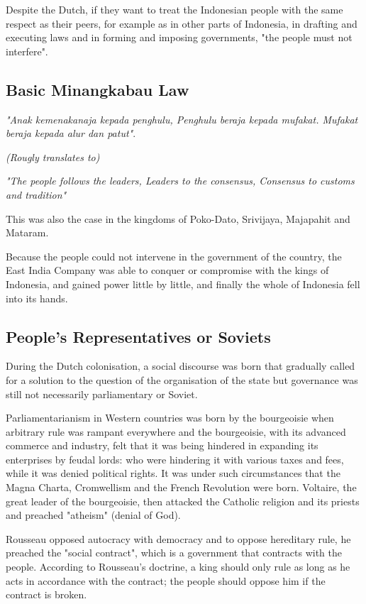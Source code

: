 Despite the Dutch, if they want to treat the Indonesian people with the same respect as their peers, 
for example as in other parts of Indonesia, in drafting and executing laws and in forming and imposing governments, 
"the people must not interfere".\nline

\subsection{Basic Minangkabau Law}

\emph{"Anak kemenakanaja kepada penghulu,\vskip 1mm Penghulu beraja kepada mufakat.\vskip 1mm Mufakat beraja kepada alur dan patut"}.\nline

\emph{(Rougly translates to)}\nline

\emph{"The people follows the leaders,\vskip 1mm Leaders to the consensus,\vskip 1mm Consensus to customs and tradition"}\nline

This was also the case in the kingdoms of Poko-Dato, Srivijaya, Majapahit and Mataram.\nline

Because the people could not intervene in the government of the country, the East India Company was able to 
conquer or compromise with the kings of Indonesia, and gained power little by little, and finally the whole 
of Indonesia fell into its hands.\nline

\subsection{People's Representatives or Soviets}

During the Dutch colonisation, a social discourse was born that gradually 
called for a solution to the question of the organisation of the state but governance was still 
not necessarily parliamentary or Soviet.\nline

Parliamentarianism in Western countries was born by the bourgeoisie when arbitrary rule was 
rampant everywhere and the bourgeoisie, with its advanced commerce and industry, felt that it 
was being hindered in expanding its enterprises by feudal lords: who were hindering it with various 
taxes and fees, while it was denied political rights. It was under such circumstances that 
the Magna Charta, Cromwellism and the French Revolution were born. Voltaire, the great leader of 
the bourgeoisie, then attacked the Catholic religion and its priests and preached "atheism" (denial of God).\nline

Rousseau opposed autocracy with democracy and to oppose hereditary rule, he preached the "social contract", which 
is a government that contracts with the people. According to Rousseau's doctrine, a king should only rule as 
long as he acts in accordance with the contract; the people should oppose him if the contract is broken.\nline

